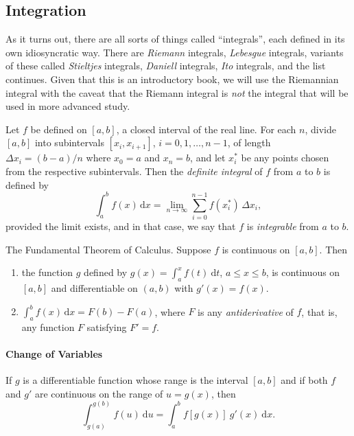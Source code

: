 \documentclass[captions=tableheading]{scrbook}
\begin{document}
\subsection{Integration}
\label{sec-21-2-4}

As it turns out, there are all sorts of things called ``integrals'', each defined in its own idiosyncratic way. There are \emph{Riemann} integrals, \emph{Lebesgue} integrals, variants of these called \emph{Stieltjes} integrals, \emph{Daniell} integrals, \emph{Ito} integrals, and the list continues. Given that this is an introductory book, we will use the Riemannian integral with the caveat that the Riemann integral is \emph{not} the integral that will be used in more advanced study.

\begin{defn}
Let \(f\) be defined on \([a,b]\), a closed interval of the real line. For each \(n\), divide \([a,b]\) into subintervals \([x_{i},x_{i+1}]\), \(i=0,1,\ldots,n-1\), of length \(\Delta x_{i}=(b-a)/n\) where \(x_{0}=a\) and \(x_{n}=b\), and let \(x_{i}^{\ast}\) be any points chosen from the respective subintervals. Then the \emph{definite integral} of \(f\) from \(a\) to \(b\) is defined by
\begin{equation}
\int_{a}^{b}f(x)\,\mathrm{d} x=\lim_{n\to\infty}\sum_{i=0}^{n-1}f(x_{i}^{\ast})\,\Delta x_{i},
\end{equation}
provided the limit exists, and in that case, we say that \(f\) is \emph{integrable} from \(a\) to \(b\). 
\end{defn}

\begin{thm}
The Fundamental Theorem of Calculus. Suppose \(f\) is continuous on \([a,b]\). Then
\begin{enumerate}
\item the function \(g\) defined by \(g(x)=\int_{a}^{x}f(t)\:\mathrm{d} t\), \(a\leq x\leq b\), is continuous on \([a,b]\) and differentiable on \((a,b)\) with \(g'(x)=f(x)\).
\item \(\int_{a}^{b}f(x)\,\mathrm{d} x=F(b)-F(a)\), where \(F\) is any \emph{antiderivative} of \(f\), that is, any function \(F\) satisfying \(F'=f\).
\end{enumerate}
\end{thm}


\paragraph*{Change of Variables}
\begin{thm}
If \(g\) is a differentiable function whose range is the interval \([a,b]\) and if both \(f\) and \(g'\) are continuous on the range of \(u = g(x)\), then
\begin{equation}
\int_{g(a)}^{g(b)}f(u)\:\mathrm{d} u=\int_{a}^{b}f[g(x)]\: g'(x)\:\mathrm{d} x.
\end{equation}
\end{thm}
\end{document}
